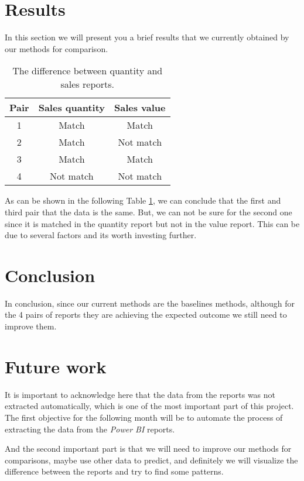 \documentclass[fleqn,moreauthors,10pt]{ds_report}
\begin{document}
\section*{Results}
In this section we will present you a brief results that we currently obtained by our methods for comparison.
\begin{table}[]
    \centering
    \begin{tabular}{c|c|c}
         Pair & Sales quantity & Sales value\\\hline
          1 &  Match & Match \\
          2 & Match & Not match \\
          3 & Match & Match \\
          4 & Not match & Not match\\
    \end{tabular}
    \caption{The difference between quantity and sales reports.}
    \label{tab:my_label}
\end{table}
As can be shown in the following Table \ref{tab:my_label}, we can conclude that the first and third pair that the data is the same. But, we can not be sure for the second one since it is matched in the quantity report but not in the value report. This can be due to several factors and its worth investing further.


\section*{Conclusion}
In conclusion, since our current methods are the baselines methods, although for the 4 pairs of reports they are achieving the expected outcome we still need to improve them.
\section*{Future work}

It is important to acknowledge here that the data from the reports was not extracted automatically, which is one of the most important part of this project. The first objective for the following month will be to automate the process of extracting the data from the \textit{Power BI} reports. 
\par
And the second important part is that we will need to improve our methods for comparisons, maybe use other data to predict, and definitely we will visualize the difference between the reports and try to find some patterns.
\end{document}
